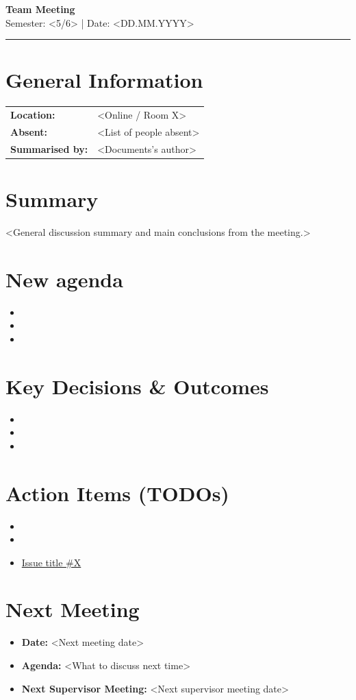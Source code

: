 \documentclass[12pt, a4paper]{article}
\begin{document}
\begin{center}
    {\LARGE\bfseries Team Meeting} \\[0.2cm]
    {\large Semester: <5/6> | Date: <DD.MM.YYYY>} \\[0.5cm]
    \rule{\linewidth}{1pt}
\end{center}

\section*{General Information}
\begin{tabular}{ll}
    \textbf{Location:} & <Online / Room X> \\
    \textbf{Absent:} & <List of people absent> \\
    \textbf{Summarised by:} & <Documents's author>
\end{tabular}

\section{Summary}
<General discussion summary and main conclusions from the meeting.>

\section{New agenda}
\begin{itemize}
    \item 
    \item
    \item
\end{itemize}

\section{Key Decisions \& Outcomes}
\begin{itemize}
    \item 
    \item
    \item
\end{itemize}

\section{Action Items (TODOs)}
\begin{itemize}
    \item 
    \item
    \item \href{https://github.com/kequel/jaskra/issues/X}{Issue title \#X}
\end{itemize}


\section{Next Meeting}
\begin{itemize}
    \item \textbf{Date:} <Next meeting date>
    \item \textbf{Agenda:} <What to discuss next time>
    \item \textbf{Next Supervisor Meeting:} <Next supervisor meeting date>
\end{itemize}
\end{document}
